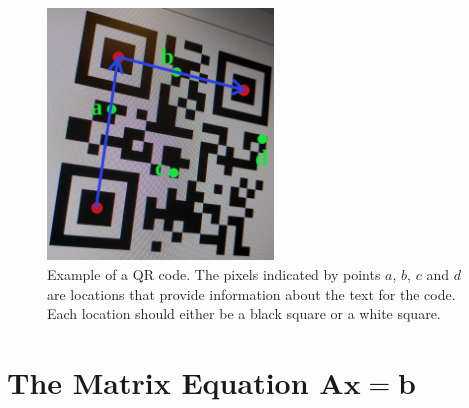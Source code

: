 \begin{exercise}
  \begin{figure}[h]
    \centering
      \includegraphics[width=6cm]{img/qrCodeSnapshotUV-points.png}
    \caption{Example of a QR code. The pixels indicated by points $a$,
    $b$, $c$ and $d$ are locations that provide information about the
    text for the code. Each location should either be a black square
    or a white square.}
    \label{fig:qrCodeExampleLocations}
  \end{figure}

\end{exercise}


\clearpage
\newpage


\section{The Matrix Equation $\boldsymbol{Ax=b}$}
\name[2.25in]

